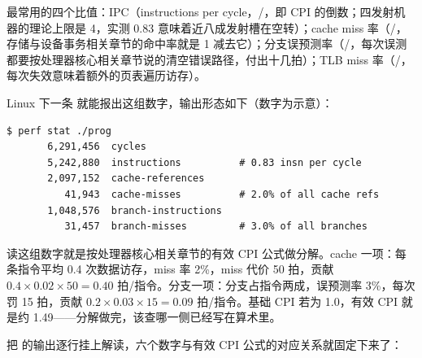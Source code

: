 最常用的四个比值：IPC（instructions per cycle，/，即 CPI 的倒数；四发射机器的理论上限是 4，实测 0.83 意味着近八成发射槽在空转）；cache miss 率（/，存储与设备事务相关章节的命中率就是 1 减去它）；分支误预测率（/，每次误测都要按处理器核心相关章节说的清空错误路径，付出十几拍）；TLB miss 率（/，每次失效意味着额外的页表遍历访存）。

Linux 下一条  就能报出这组数字，输出形态如下（数字为示意）：

\begin{lstlisting}
$ perf stat ./prog
       6,291,456  cycles
       5,242,880  instructions          # 0.83 insn per cycle
       2,097,152  cache-references
          41,943  cache-misses          # 2.0% of all cache refs
       1,048,576  branch-instructions
          31,457  branch-misses         # 3.0% of all branches
\end{lstlisting}

读这组数字就是按处理器核心相关章节的有效 CPI 公式做分解。cache 一项：每条指令平均 0.4 次数据访存，miss 率 2\%，miss 代价 50 拍，贡献 $0.4\times0.02\times50=0.40$ 拍/指令。分支一项：分支占指令两成，误预测率 3\%，每次罚 15 拍，贡献 $0.2\times0.03\times15=0.09$ 拍/指令。基础 CPI 若为 1.0，有效 CPI 就是约 1.49——分解做完，该查哪一侧已经写在算术里。

把  的输出逐行挂上解读，六个数字与有效 CPI 公式的对应关系就固定下来了：

